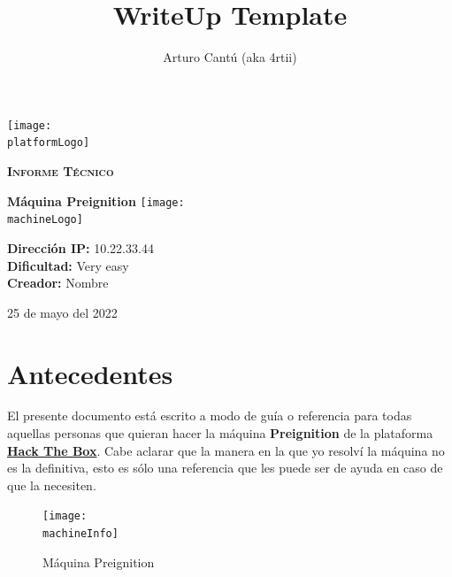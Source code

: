 \documentclass[a4paper]{article} %
\title{WriteUp Template}
\author{Arturo Cantú (aka 4rtii)}
\newcommand{\platformLogo}{img/HTB-Logo.png}        %
\newcommand{\platformURL}{https://hackthebox.com}   %
\newcommand{\machineName}{Preignition}              %
\newcommand{\machineLogo}{img/preignitionLogo.png}  %
\newcommand{\machineInfo}{img/preignitionInfo.png}  %
\newcommand{\machineIP}{10.22.33.44}                %
\newcommand{\machineDiff}{Very easy}                %
\newcommand{\startDate}{25 de mayo del 2022}        %
\begin{document}
    \fancyfoot[R]{\thepage}     %
    \begin{titlepage}
        \centering
        \texttt{[image: \\platformLogo]}\par\vspace{1cm} %
        {\scshape\LARGE\textbf{Informe Técnico}\par}
        \vspace{0.3cm}
        {\Huge\bfseries\textcolor{greenCover}{Máquina \machineName}}
        \vfill\vfill
        \texttt{[image: \\machineLogo]}\par\vspace{1cm} %
        \vfill
        \begin{tcolorbox}[colback=red!5!white,colframe=red!75!black]    %
            \centering
            \textbf{Dirección IP:} \machineIP\\\textbf{Dificultad:} \machineDiff\\\textbf{Creador:} Nombre
        \end{tcolorbox}
        \vfill
        {\large \startDate\par}
        \vfill
    \end{titlepage}
    
    \clearpage          %
    \tableofcontents    %
    \clearpage          %
    
    \section{Antecedentes}
        El presente documento está escrito a modo de guía o referencia para todas aquellas personas que quieran hacer la máquina \textbf{\machineName} de la plataforma \href{\platformURL}{\textbf{Hack The Box}}. Cabe aclarar que la manera en la que yo resolví la máquina no es la definitiva, esto es sólo una referencia que les puede ser de ayuda en caso de que la necesiten.
        
        \vspace{0.2cm}
        
        \begin{figure}[h]
            \centering
            \texttt{[image: \\machineInfo]}     %
            \caption{Máquina {\machineName}}
            \label{fig:preignition}
        \end{figure}
        
\end{document}
